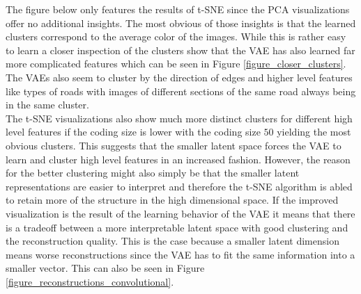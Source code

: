 The figure below only features the results of t-SNE since the PCA visualizations offer no additional insights.
The most obvious of those insights is that the learned clusters correspond to the average color of the images.
While this is rather easy to learn a closer inspection of the clusters show that the VAE has also learned far
more complicated features which can be seen in Figure \ref{figure_closer_clusters}. The VAEs also seem to
cluster by the direction of edges and higher level features like types of roads with images of different sections
of the same road always being in the same cluster.\\

The t-SNE visualizations also show much more distinct clusters for different high level features if the coding
size is lower with the coding size $50$ yielding the most obvious clusters. This suggests that the smaller
latent space forces the VAE to learn and cluster high level features in an increased fashion. However, 
the reason for the better clustering might also simply be that the smaller latent representations are easier
to interpret and therefore the t-SNE algorithm is abled to retain more of the structure in the high dimensional
space.
If the improved visualization is the result of the learning behavior of the VAE 
it means that there is a tradeoff between a more interpretable latent space with 
good clustering and the reconstruction quality. This is the case because a smaller latent dimension 
means worse reconstructions
since the VAE has to fit the same information into a smaller vector. This can also be seen in Figure
\ref{figure_reconstructions_convolutional}.

